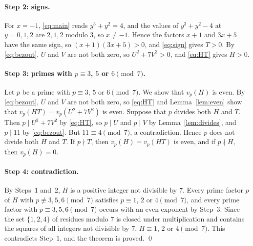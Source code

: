 \documentclass[11pt]{article}
\begin{document}
\paragraph{Step 2: signs.} For $x=-1$, \eqref{eq:main} reads $y^3+y^2=4$, and the values of $y^3+y^2-4$ at $y=0,1,2$ are $2,1,2$ modulo $3$, so $x\neq-1$. Hence the factors $x+1$ and $3x+5$ have the same sign, so $(x+1)(3x+5)>0$, and \eqref{eq:sign} gives $T>0$. By \eqref{eq:bezout}, $U$ and $V$ are not both zero, so $U^2+7V^2>0$, and \eqref{eq:HT} gives $H>0$.

\paragraph{Step 3: primes with $p\equiv3$, $5$ or $6\pmod7$.} Let $p$ be a prime with $p\equiv3$, $5$ or $6\pmod7$. We show that $v_p(H)$ is even. By \eqref{eq:bezout}, $U$ and $V$ are not both zero, so \eqref{eq:HT} and Lemma~\ref{lem:even} show that $v_p(HT)=v_p(U^2+7V^2)$ is even. Suppose that $p$ divides both $H$ and $T$. Then $p\mid U^2+7V^2$ by \eqref{eq:HT}, so $p\mid U$ and $p\mid V$ by Lemma~\ref{lem:divides}, and $p\mid 11$ by \eqref{eq:bezout}. But $11\equiv4\pmod7$, a contradiction. Hence $p$ does not divide both $H$ and $T$. If $p\nmid T$, then $v_p(H)=v_p(HT)$ is even, and if $p\nmid H$, then $v_p(H)=0$.

\paragraph{Step 4: contradiction.} By Steps~1 and~2, $H$ is a positive integer not divisible by $7$. Every prime factor $p$ of $H$ with $p\not\equiv3,5,6\pmod7$ satisfies $p\equiv1$, $2$ or $4\pmod7$, and every prime factor with $p\equiv3,5,6\pmod7$ occurs with an even exponent by Step~3. Since the set $\{1,2,4\}$ of residues modulo $7$ is closed under multiplication and contains the squares of all integers not divisible by $7$, $H\equiv1$, $2$ or $4\pmod7$. This contradicts Step~1, and the theorem is proved.
\qed
\end{document}
